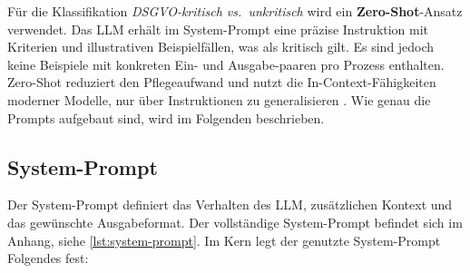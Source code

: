 Für die Klassifikation \emph{\ac{DSGVO}-kritisch vs.\ unkritisch} wird ein \textbf{Zero-Shot}-Ansatz verwendet. Das \ac{LLM} erhält im System-Prompt eine präzise Instruktion mit Kriterien und illustrativen Beispielfällen, was als kritisch gilt. Es sind jedoch keine Beispiele mit konkreten Ein- und Ausgabe-paaren pro Prozess enthalten. Zero-Shot reduziert den Pflegeaufwand und nutzt die In-Context-Fähigkeiten moderner Modelle, nur über Instruktionen zu generalisieren \cite{brown2020fewshot,liu2023prompting}. Wie genau die Prompts aufgebaut sind, wird im Folgenden beschrieben.

\subsection*{System-Prompt}

Der System-Prompt definiert das Verhalten des \ac{LLM}, zusätzlichen Kontext und das gewünschte Ausgabeformat. Der vollständige System-Prompt befindet sich im Anhang, siehe \ref{lst:system-prompt}. Im Kern legt der genutzte System-Prompt Folgendes fest:

